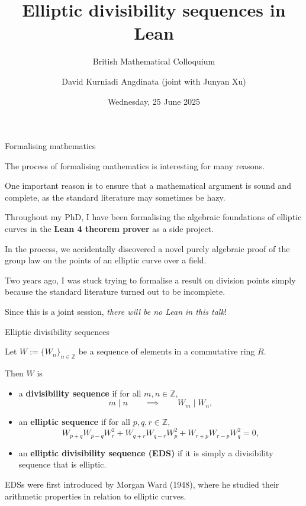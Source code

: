 \documentclass[10pt]{beamer}
\title{Elliptic divisibility sequences in Lean}
\subtitle{British Mathematical Colloquium}
\author{David Kurniadi Angdinata (joint with Junyan Xu)}
\institute{London School of Geometry and Number Theory}
\date{Wednesday, 25 June 2025}
\begin{document}
\frame{\titlepage}

\begin{frame}[t]{Formalising mathematics}

The process of formalising mathematics is interesting for many reasons.

\vspace{0.5cm} One important reason is to ensure that a mathematical argument is sound and complete, as the standard literature may sometimes be hazy.

\vspace{0.5cm} Throughout my PhD, I have been formalising the algebraic foundations of elliptic curves in the \textbf{Lean 4 theorem prover} as a side project.

\vspace{0.5cm} In the process, we accidentally discovered a novel purely algebraic proof of the group law on the points of an elliptic curve over a field.

\vspace{0.5cm} Two years ago, I was stuck trying to formalise a result on division points simply because the standard literature turned out to be incomplete.

\vspace{0.5cm} Since this is a joint session, \emph{there will be no Lean in this talk}!

\end{frame}

\begin{frame}[t]{Elliptic divisibility sequences}

Let $ W := \{W_n\}_{n \in \mathbb{Z}} $ be a sequence of elements in a commutative ring $ R $.

\vspace{0.5cm} Then $ W $ is
\begin{itemize}
\item a \textbf{divisibility sequence} if for all $ m, n \in \mathbb{Z} $,
$$ m \mid n \qquad \implies \qquad W_m \mid W_n, $$
\item an \textbf{elliptic sequence} if for all $ p, q, r \in \mathbb{Z} $,
$$ W_{p + q}W_{p - q}W_r^2 + W_{q + r}W_{q - r}W_p^2 + W_{r + p}W_{r - p}W_q^2 = 0, $$
\item an \textbf{elliptic divisibility sequence (EDS)} if it is simply a divisibility sequence that is elliptic.
\end{itemize}

\vspace{0.5cm} EDSs were first introduced by Morgan Ward (1948), where he studied their arithmetic properties in relation to elliptic curves.

\end{frame}
\end{document}
